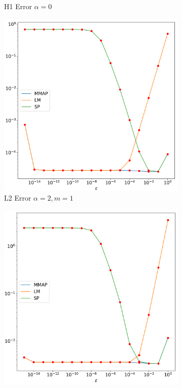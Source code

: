 \documentclass[12pt]{ociamthesis}
\begin{document}
\begin{figure}[H]
\begin{subfigure}{0.42\textwidth}
     \caption{H1 Error $\alpha=0$}
 \end{subfigure}
 \begin{subfigure}{0.42\textwidth}
     \includegraphics[width=\textwidth]{Pics/LHSims/E1b_MMAP_LM_SPL2.png}
     \caption{L2 Error $\alpha=2, m=1$}
 \end{subfigure}
 \begin{subfigure}{0.42\textwidth}
     \includegraphics[width=\textwidth]{Pics/LHSims/E1b_MMAP_LM_SPH1.png}

\end{subfigure}
\end{figure}
\end{document}
